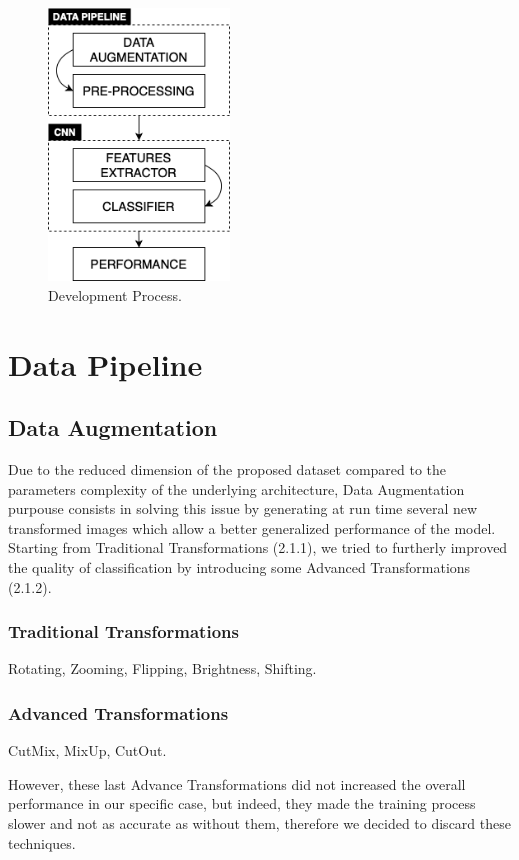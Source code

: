 \documentclass[conference,compsoc]{IEEEtran}
\begin{document}
\begin{figure}[h!]
\centering
\includegraphics[width=1.9in]{img/development.png}
\caption{Development Process.}
\label{fig_sim}
\end{figure}

\section{Data Pipeline}
\subsection{Data Augmentation}
Due to the reduced dimension of the proposed dataset compared to the parameters complexity of the underlying architecture, Data Augmentation purpouse consists in solving this issue by generating at run time several new transformed images which allow a better generalized performance of the model. \\
Starting from Traditional Transformations (2.1.1), we tried to furtherly improved the quality of classification by introducing some Advanced Transformations (2.1.2).
\subsubsection{Traditional Transformations}
Rotating, Zooming, Flipping, Brightness, Shifting.
\subsubsection{Advanced Transformations}
CutMix, MixUp, CutOut.

However, these last Advance Transformations did not increased the overall performance in our specific case, but indeed, they made the training process slower and not as accurate as without them, therefore we decided to discard these techniques.
\end{document}
